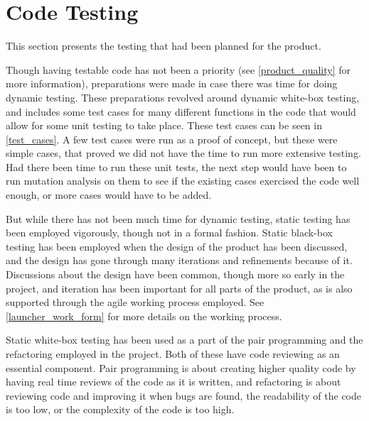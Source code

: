 \section{Code Testing}
This section presents the testing that had been planned for the product. \newline

Though having testable code has not been a priority (see \autoref{product_quality} for more information), preparations were made in case there was time for doing dynamic testing. 
These preparations revolved around dynamic white-box testing, and includes some test cases for many different functions in the code that would allow for some unit testing to take place. 
These test cases can be seen in \autoref{test_cases}. 
A few test cases were run as a proof of concept, but these were simple cases, that proved we did not have the time to run more extensive testing. \newline
Had there been time to run these unit tests, the next step would have been to run mutation analysis on them to see if the existing cases exercised the code well enough, or more cases would have to be added. \newline

But while there has not been much time for dynamic testing, static testing has been employed vigorously, though not in a formal fashion. 
Static black-box testing has been employed when the design of the product has been discussed, and the design has gone through many iterations and refinements because of it. 
Discussions about the design have been common, though more so early in the project, and iteration has been important for all parts of the product, as is also supported through the agile working process employed. 
See \autoref{launcher_work_form} for more details on the working process. \newline

Static white-box testing has been used as a part of the pair programming and the refactoring employed in the project. 
Both of these have code reviewing as an essential component. 
Pair programming is about creating higher quality code by having real time reviews of the code as it is written, and refactoring is about reviewing code and improving it when bugs are found, the readability of the code is too low, or the complexity of the code is too high.